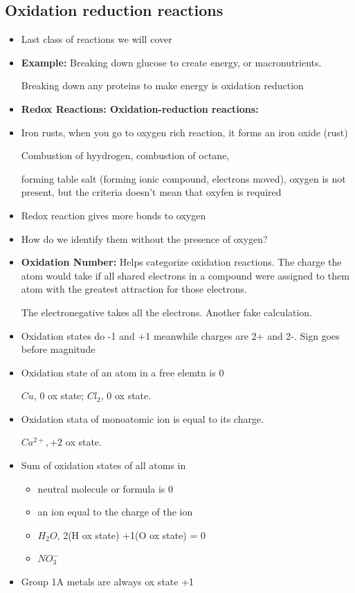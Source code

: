 \documentclass{article}
\begin{document}
\subsection{Oxidation reduction reactions}
\begin{itemize}
  \item Last class of reactions we will cover
  \item \textbf{Example:} Breaking down glucose to create energy, or macronutrients.

    Breaking down any proteins to make energy is oxidation reduction
  \item \textbf{Redox Reactions: Oxidation-reduction reactions:}
  \item Iron rusts, when you go to oxygen rich reaction, it forms an iron oxide (rust)

    Combustion of hyydrogen, combustion of octane,

    forming table salt (forming ionic compound, electrons moved), oxygen is not present,
    but the criteria doesn't mean that oxyfen is required
  \item Redox reaction gives more bonds to oxygen
  \item How do we identify them without the presence of oxygen?
  \item \textbf{Oxidation Number:} Helps categorize oxidation reactions. The charge the atom
    would take if all shared electrons in a compound were assigned to them atom with the
    greatest attraction for those electrons.

    The electronegative takes all the electrons. Another fake calculation.
  \item Oxidation states do -1 and +1 meanwhile charges are 2+ and 2-.
    Sign goes before magnitude
  \item Oxidation state of an atom in a free elemtn is 0

    $Cu $, 0 ox state; $Cl_2$, 0 ox state.
  \item Oxidation stata of monoatomic ion is equal to its charge.

    $Ca^{2+}, +2 $ ox state.

  \item Sum of oxidation states of all atoms in
    \begin{itemize}
      \item neutral molecule or formula is 0
      \item an ion equal to the charge of the ion
      \item $H_2O$, 2(H ox state) +1(O ox state) = 0
      \item $ NO_3^-$
    \end{itemize}
  \item Group 1A metals are always ox state +1


\end{itemize}
\end{document}
